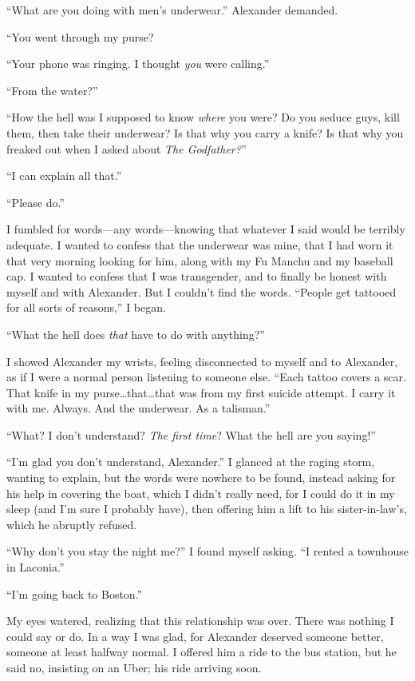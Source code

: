 ``What are you doing with men's underwear.'' Alexander demanded.

``You went through my purse?

``Your phone was ringing. I thought \emph{you} were calling.''

``From the water?''

``How the hell was I supposed to know \emph{where} you were? Do you
seduce guys, kill them, then take their underwear? Is that why you carry
a knife? Is that why you freaked out when I asked about \emph{The
Godfather?}''

``I can explain all that.''

``Please do.''

I fumbled for words---any words---knowing that whatever I said would be
terribly adequate. I wanted to confess that the underwear was mine, that
I had worn it that very morning looking for him, along with my Fu Manchu
and my baseball cap. I wanted to confess that I was transgender, and to
finally be honest with myself and with Alexander. But I couldn't find
the words. ``People get tattooed for all sorts of reasons,'' I began.

``What the hell does \emph{that} have to do with anything?''

I showed Alexander my wrists, feeling disconnected to myself and to
Alexander, as if I were a normal person listening to someone else.
``Each tattoo covers a scar. That knife in my
purse\ldots that\ldots that was from my first suicide attempt. I carry
it with me. Always. And the underwear. As a talisman.''

``What? I don't understand? \emph{The first time}? What the hell are you
saying!''

``I'm glad you don't understand, Alexander.'' I glanced at the raging
storm, wanting to explain, but the words were nowhere to be found,
instead asking for his help in covering the boat, which I didn't really
need, for I could do it in my sleep (and I'm sure I probably have), then
offering him a lift to his sister-in-law's, which he abruptly refused.

``Why don't you stay the night me?'' I found myself asking. ``I rented a
townhouse in Laconia.''

``I'm going back to Boston.''

My eyes watered, realizing that this relationship was over. There was
nothing I could say or do. In a way I was glad, for Alexander deserved
someone better, someone at least halfway normal. I offered him a ride to
the bus station, but he said no, insisting on an Uber; his ride arriving
soon.

